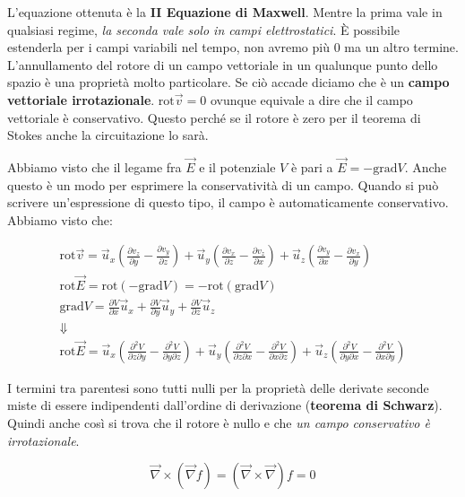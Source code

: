 L'equazione ottenuta è la \textbf{II Equazione di Maxwell}. Mentre la prima vale in qualsiasi regime, \emph{la seconda vale solo in campi elettrostatici}. È possibile estenderla per i campi variabili nel tempo, non avremo più $0$ ma un altro termine. L'annullamento del rotore di un campo vettoriale in un qualunque punto dello spazio è una proprietà molto particolare. Se ciò accade diciamo che è un \textbf{campo vettoriale irrotazionale}.
$ \text{rot}\vec{v} =0 $ ovunque equivale a dire che il campo vettoriale è conservativo. Questo perché se il rotore è zero per il teorema di Stokes anche la circuitazione lo sarà.

Abbiamo visto che il legame fra $\vec{E}$ e il potenziale $V$ è pari a $ \vec{E} = - \text{grad}V $.
Anche questo è un modo per esprimere la conservatività di un campo. Quando si può scrivere un'espressione di questo tipo, il campo è automaticamente conservativo.
Abbiamo visto che:

\begin{gather*}
	\text{rot}\vec{v} = \vec{u}_x\left( \frac{\partial v_z}{\partial y} -\frac{\partial v_y}{\partial z}  \right)  +
	\vec{u}_y\left( \frac{\partial v_x}{\partial z} -\frac{\partial v_z}{\partial x}  \right)  +
	\vec{u}_z\left( \frac{\partial v_y}{\partial x} -\frac{\partial v_x}{\partial y}  \right) \\
	\text{rot}\vec{E} = \text{rot}(-\text{grad}V) = - \text{rot}(\text{grad}V) \\
	\text{grad}V = \frac{\partial V}{\partial x} \vec{u}_x + \frac{\partial V}{\partial y} \vec{u}_y + \frac{\partial V}{\partial z} \vec{u}_z \\
	\Downarrow \\
	\text{rot}\vec{E} = \vec{u}_x \left( \frac{\partial^2 V}{\partial z \partial y} - \frac{\partial^2 V}{\partial y \partial z}\right) + \vec{u}_y \left( \frac{\partial^2 V}{\partial z \partial x} - \frac{\partial^2 V}{\partial x \partial z}\right) + \vec{u}_z \left( \frac{\partial^2 V}{\partial y \partial x} - \frac{\partial^2 V}{\partial x \partial y}\right)
\end{gather*}

I termini tra parentesi sono tutti nulli per la proprietà delle derivate seconde miste di essere indipendenti dall'ordine di derivazione (\textbf{teorema di Schwarz}).
Quindi anche così si trova che il rotore è nullo e che \emph{un campo conservativo è irrotazionale}.

\[
	\vec{\nabla} \times (\vec{\nabla} f)=(\vec{\nabla} \times \vec{\nabla} ) f = 0
\]

